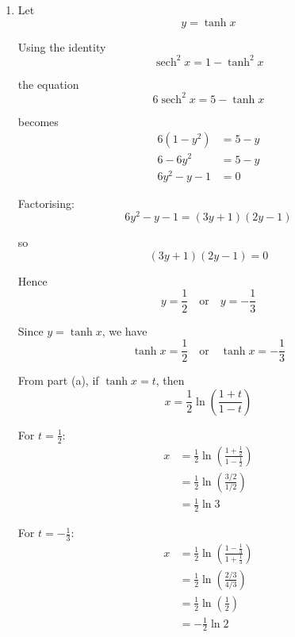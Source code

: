\documentclass[leqno]{article}
\begin{document}
\begin{enumerate}[
  label=\textbf{\arabic*.},
  leftmargin=*,
  topsep=0pt,
  partopsep=0pt,
  parsep=0pt
]
\begin{djsSolution}
\begin{enumerate}[label=\textbf{(\alph*)}]
Multiply numerator and denominator by $e^q$:
\[
\tanh q=\frac{e^{2q}-1}{e^{2q}+1}
\]

Given
\[
q=\frac12\ln\left(\frac{1+t}{1-t}\right)
\]

we have
\[
2q=\ln\left(\frac{1+t}{1-t}\right)
\]

so, exponentiating:
\[
e^{2q}=\frac{1+t}{1-t}
\]

Substitute this into the formula for $\tanh q$:
\begin{align*}
\tanh q
&=\frac{\frac{1+t}{1-t}-1}{\frac{1+t}{1-t}+1} \\
&=\frac{\frac{1+t-(1-t)}{1-t}}{\frac{1+t+(1-t)}{1-t}} \\
&=\frac{\frac{2t}{1-t}}{\frac{2}{1-t}} \\
&=t
\end{align*}

Hence
\[
\tanh q=t
\]

  \item Let
\[
y=\tanh x
\]

Using the identity
\[
\operatorname{sech}^2 x=1-\tanh^2 x
\]

the equation
\[
6\operatorname{sech}^2 x=5-\tanh x
\]

becomes
\begin{align*}
6(1-y^2)&=5-y \\
6-6y^2&=5-y \\
6y^2-y-1&=0
\end{align*}

Factorising:
\[
6y^2-y-1=(3y+1)(2y-1)
\]

so
\[
(3y+1)(2y-1)=0
\]

Hence
\[
y=\frac12 \quad \text{or} \quad y=-\frac13
\]

Since $y=\tanh x$, we have
\[
\tanh x=\frac12 \quad \text{or} \quad \tanh x=-\frac13
\]

From part (a), if $\tanh x=t$, then
\[
x=\frac12\ln\left(\frac{1+t}{1-t}\right)
\]

For $t=\frac12$:
\begin{align*}
x&=\frac12\ln\left(\frac{1+\frac12}{1-\frac12}\right) \\
&=\frac12\ln\left(\frac{3/2}{1/2}\right) \\
&=\frac12\ln 3
\end{align*}

For $t=-\frac13$:
\begin{align*}
x&=\frac12\ln\left(\frac{1-\frac13}{1+\frac13}\right) \\
&=\frac12\ln\left(\frac{2/3}{4/3}\right) \\
&=\frac12\ln\left(\frac12\right) \\
&=-\frac12\ln 2
\end{align*}


\end{enumerate}
\end{djsSolution}
\end{enumerate}
\end{document}
